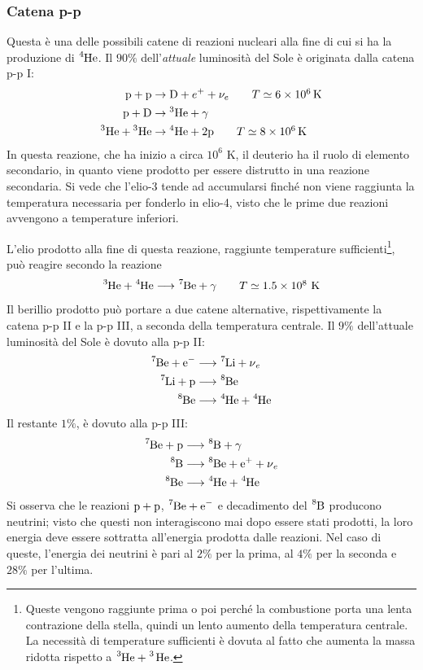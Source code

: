 \documentclass[11pt, a4paper]{scrartcl}
\theoremstyle{style}
\theoremstyle{style1}
\numberwithin{equation}{subsection}
\begin{document}
\subsubsection{Catena p-p}
Questa \`e una delle possibili catene di reazioni nucleari alla fine di cui si ha la produzione di $\ce{^{4}He}$.
Il $90\%$ dell'\textit{attuale} luminosit\`a del Sole \`e originata dalla catena p-p I:
\begin{align}
\mathrm{p+p} &\rightarrow \mathrm{D}+e^++\nu_e \tag*{$T\simeq6\times10^6\,\mathrm{K}$}\\
\mathrm{p+D} &\rightarrow {}^3\mathrm{He}+\gamma \tag*{}\\
{}^3\mathrm{He}+{}^3\mathrm{He}
&\rightarrow {}^4\mathrm{He}+2\mathrm{p}
\tag*{$T\simeq8\times10^6\,\mathrm{K}$}
\end{align}
In questa reazione, che ha inizio a circa $10^6 $ K, il deuterio ha il ruolo di elemento secondario, in quanto viene prodotto per essere distrutto in una reazione secondaria.
Si vede che l'elio-3 tende ad accumularsi finch\'e non viene raggiunta la temperatura necessaria per fonderlo in elio-4, visto che le prime due reazioni avvengono a temperature inferiori.

L'elio prodotto alla fine di questa reazione, raggiunte temperature sufficienti\footnote{Queste vengono raggiunte prima o poi perch\'e la combustione porta una lenta contrazione della stella, quindi un lento aumento della temperatura centrale. La necessit\`a di temperature sufficienti \`e dovuta al fatto che aumenta la massa ridotta rispetto a $\ce{^{3}He + ^{3} He} $.}, pu\`o reagire secondo la reazione 
\begin{equation}
	\ce{^{3}He + ^{4}He} \longrightarrow \ce{^{7}Be +\gamma}\tag*{$T\simeq 1.5 \times 10^8$ K}
\end{equation}
Il berillio prodotto pu\`o portare a due catene alternative, rispettivamente la catena p-p II e la p-p III, a seconda della temperatura centrale.
Il $9\%$ dell'attuale luminosit\`a del Sole \`e dovuto alla p-p II:
\[
	\begin{split}
		\ce{^{7}Be + e-} &\longrightarrow \ce{^{7}Li + \nu _e} \\
	\ce{^{7}Li + p } & \longrightarrow \ce{^{8}Be}\\
	\ce{^{8}Be} &\longrightarrow \ce{^{4}He + ^{4}He} 
	\end{split}
\] 
Il restante $1\%$, \`e dovuto alla p-p III:
\[
\begin{split}
	\ce{^{7}Be + p} &\longrightarrow \ce{^{8}B + \gamma}\\
	\ce{^{8}B}&\longrightarrow \ce{^{8}Be + e+ + \nu _e}\\
	\ce{^{8}Be}&\longrightarrow \ce{^{4}He + ^{4}He}
\end{split} 
\] 
Si osserva che le reazioni $\ce{p + p}$, $\ce{^{7}Be + e-}$ e decadimento del $\ce{^{8}B}$ producono neutrini; visto che questi non interagiscono mai dopo essere stati prodotti, la loro energia deve essere sottratta all'energia prodotta dalle reazioni.
Nel caso di queste, l'energia dei neutrini \`e pari al $2\%$ per la prima, al $4\%$ per la seconda e $28\%$ per l'ultima.
\end{document}
